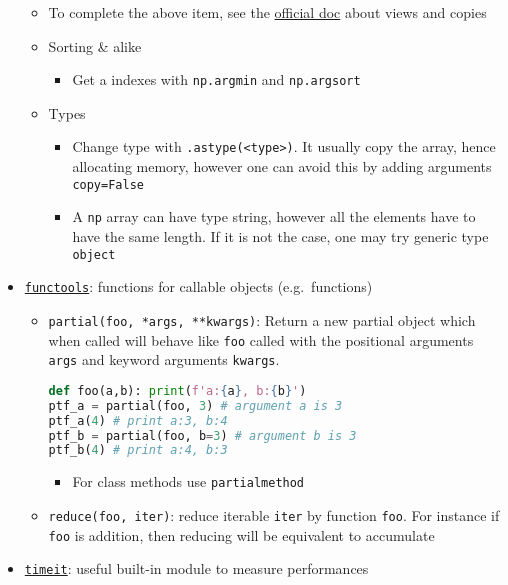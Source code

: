 \documentclass[a4paper,12pt,%
              final%
              ]{article}
\begin{document}
\begin{itemize}
\begin{itemize}
      \item To complete the above item, see the \href{https://numpy.org/doc/stable/user/basics.copies.html}{official doc} about views and copies
      \item Sorting \& alike
        \begin{itemize}
          \item Get a indexes with \verb|np.argmin| and \verb|np.argsort|
        \end{itemize}
      \item Types
        \begin{itemize}
          \item Change type with \verb|.astype(<type>)|. It usually copy the array, hence allocating memory, however one can avoid this by adding arguments \texttt{copy=False}
          \item A \texttt{np} array can have type string, however all the elements have to have the same length. If it is not the case, one may try generic type \texttt{object}
        \end{itemize}
    \end{itemize}
  \item \href{https://docs.python.org/3/library/functools.html}{\texttt{functools}}: functions for callable objects (e.g.\ functions)
    \begin{itemize}
      \item \verb|partial(foo, *args, **kwargs)|: Return a new partial object which when called will behave like \texttt{foo} called with the positional arguments \texttt{args} and keyword arguments \texttt{kwargs}.
\begin{lstlisting}[language=python]
def foo(a,b): print(f'a:{a}, b:{b}')
ptf_a = partial(foo, 3) # argument a is 3
ptf_a(4) # print a:3, b:4
ptf_b = partial(foo, b=3) # argument b is 3
ptf_b(4) # print a:4, b:3
\end{lstlisting}
        \begin{itemize}
          \item For class methods use \texttt{partialmethod}
        \end{itemize}
      \item \verb|reduce(foo, iter)|: reduce iterable \texttt{iter} by function \texttt{foo}. For instance if \texttt{foo} is addition, then reducing will be equivalent to accumulate
    \end{itemize}
  \item \href{https://docs.python.org/3/library/timeit.html}{\texttt{timeit}}: useful built-in module to measure performances

\end{itemize}
\end{document}
